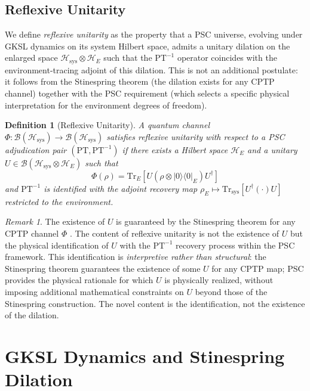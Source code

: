 \documentclass[11pt,twocolumn]{article}
\newtheorem{definition}[theorem]{Definition}
\theoremstyle{remark}
\newtheorem{remark}[theorem]{Remark}
\begin{document}
\subsection{Reflexive Unitarity}

We define \emph{reflexive unitarity} as the property that a PSC
universe, evolving under GKSL dynamics on its system Hilbert space,
admits a unitary dilation on the enlarged space
$\mathcal{H}_{\mathrm{sys}} \otimes \mathcal{H}_E$ such that the
$\mathrm{PT}^{-1}$ operator coincides with the environment-tracing
adjoint of this dilation. This is not an additional postulate: it
follows from the Stinespring theorem (the dilation exists for any
CPTP channel) together with the PSC requirement (which selects a
specific physical interpretation for the environment degrees of
freedom).

\begin{definition}[Reflexive Unitarity]
A quantum channel $\Phi: \mathcal{B}(\mathcal{H}_{\mathrm{sys}}) \to
\mathcal{B}(\mathcal{H}_{\mathrm{sys}})$ satisfies \emph{reflexive
unitarity} with respect to a PSC adjudication pair
$(\mathrm{PT},\mathrm{PT}^{-1})$ if there exists a Hilbert space
$\mathcal{H}_E$ and a unitary $U \in \mathcal{B}(\mathcal{H}_{\mathrm{sys}}
\otimes \mathcal{H}_E)$ such that
\[
  \Phi(\rho) = \mathrm{Tr}_E\!\left[U\!\left(\rho \otimes
  |0\rangle\langle 0|_E\right)U^\dagger\right]
\]
and $\mathrm{PT}^{-1}$ is identified with the adjoint recovery map
$\rho_E \mapsto \mathrm{Tr}_{\mathrm{sys}}[U^\dagger(\cdot)U]$
restricted to the environment.
\end{definition}

\begin{remark}
The existence of $U$ is guaranteed by the Stinespring theorem for any
CPTP channel $\Phi$ \cite{Stinespring1955,Nielsen2000}. The content of
reflexive unitarity is not the existence of $U$ but the physical
identification of $U$ with the $\mathrm{PT}^{-1}$ recovery process
within the PSC framework. This identification is \emph{interpretive
rather than structural}: the Stinespring theorem guarantees the
existence of some $U$ for any CPTP map; PSC provides the physical
rationale for which $U$ is physically realized, without imposing
additional mathematical constraints on $U$ beyond those of the
Stinespring construction. The novel content is the identification, not
the existence of the dilation.
\end{remark}

\section{GKSL Dynamics and Stinespring Dilation}
\label{sec:gksl}
\end{document}
